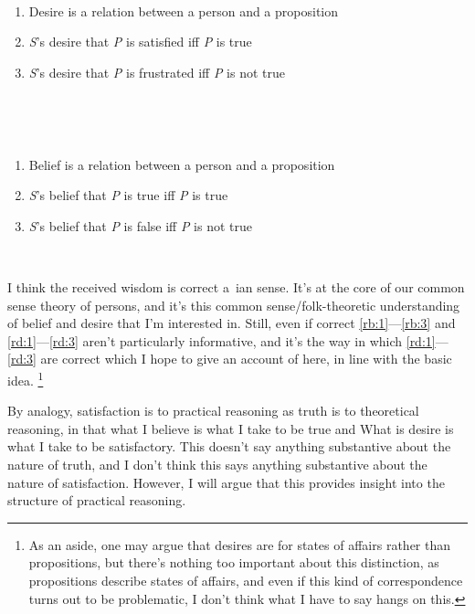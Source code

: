 \documentclass[10pt]{article}
\begin{document}
\begin{minipage}{0.45\linewidth}\mbox{ }
  \begin{enumerate}[labelindent=\parindent,leftmargin=*,label=(RB\arabic*)]
  \item\label{rd:1} Desire is a relation between a person and a proposition
  \item\label{rd:2} \emph{S}’s desire that \emph{P} is satisfied iff \emph{P} is true
  \item\label{rd:3} \emph{S}’s desire that \emph{P} is frustrated iff \emph{P} is not true
  \end{enumerate}\mbox{ }
\end{minipage}\hfill
\begin{minipage}{0.45\linewidth}\mbox{ }
  \begin{enumerate}[labelindent=\parindent,leftmargin=*,label=(RD\arabic*)]
  \item\label{rb:1} Belief is a relation between a person and a proposition
  \item\label{rb:2} \emph{S}’s belief that \emph{P} is true iff \emph{P} is true
  \item\label{rb:3} \emph{S}’s belief that \emph{P} is false iff \emph{P} is not true
  \end{enumerate}\mbox{ }
\end{minipage}

I think the received wisdom is correct a~\citeauthor{Lewis:1974aa}ian sense.
It's at the core of our common sense theory of persons, and it's this common sense/folk-theoretic understanding of belief and desire that I'm interested in.
Still, even if correct \ref{rb:1}---\ref{rb:3} and \ref{rd:1}---\ref{rd:3} aren't particularly informative, and it's the way in which \ref{rd:1}---\ref{rd:3} are correct which I hope to give an account of here, in line with the basic idea.\nolinebreak
\footnote{As an aside, one may argue that desires are for states of affairs rather than propositions, but there's nothing too important about this distinction, as propositions describe states of affairs, and even if this kind of correspondence turns out to be problematic, I don't think what I have to say hangs on this.}

By analogy, satisfaction is to practical reasoning as truth is to theoretical reasoning, in that what I believe is what I take to be true and What is desire is what I take to be satisfactory.
This doesn't say anything substantive about the nature of truth, and I don't think this says anything substantive about the nature of satisfaction.
However, I will argue that this provides insight into the structure of practical reasoning.
\end{document}
